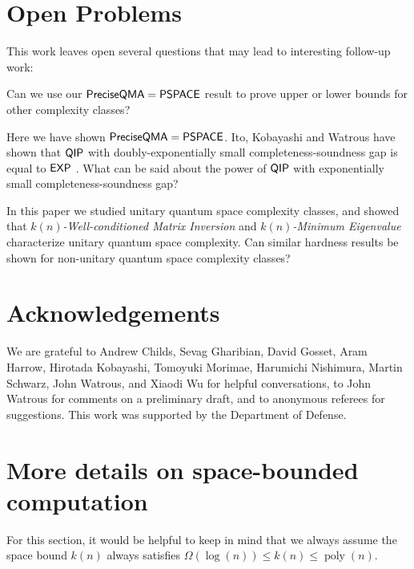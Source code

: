 \documentclass[11pt]{article}
\newtheorem{corollary}[theorem]{Corollary}
\theoremstyle{definition}
\theoremstyle{remark}
\newcommand\EXP{{\sf{EXP}}}
\newcommand\QIP{{\sf{QIP}}}
\newcommand\PSPACE{{\sf{PSPACE}}}
\newcommand\preciseQMA{{\sf{PreciseQMA}}}
\newcommand\matrixinvert[1]{{\ensuremath{#1}}\textit{-Well-conditioned Matrix Inversion}}
\newcommand\spechamiltonian[1]{\ensuremath{#1}\textit{-Minimum Eigenvalue}}
\newcommand{\classfont}{\sf}
\newcommand{\Unitary}{\mathbf{U}}
\newcommand{\unitaryQSPACE}[3]{{\classfont{Q}_\Unitary\classfont{SPACE}}[#1](#2,#3)}
\DeclareMathOperator{\poly}{poly}
\begin{document}
%


\section{Open Problems}
This work leaves open several questions that may lead to interesting follow-up work:
\begin{compactenum}
\begin{item} Can we use our $\preciseQMA=\PSPACE$ result to prove upper or lower bounds for other complexity classes? \end{item}
\begin{item} Here we have shown $\preciseQMA=\PSPACE$.  Ito, Kobayashi and Watrous  have shown that $\QIP$ with doubly-exponentially small completeness-soundness gap is equal to $\EXP$ \cite{ikw12}.  What can be said about the power of $\QIP$ with exponentially small completeness-soundness gap?\end{item}
\begin{item}In this paper we studied unitary quantum space complexity classes, and showed that \matrixinvert{k(n)} and \spechamiltonian{k(n)} characterize unitary quantum space complexity.  Can similar hardness results be shown for non-unitary quantum space complexity classes?\end{item}
\end{compactenum}


\section{Acknowledgements}
We are grateful to Andrew Childs, Sevag Gharibian, David Gosset, Aram Harrow, Hirotada Kobayashi, Tomoyuki Morimae, Harumichi Nishimura, Martin Schwarz, John Watrous, and Xiaodi Wu for helpful conversations, to John Watrous for comments on a preliminary draft, and to anonymous referees for suggestions. This work was supported by the Department of Defense.

\appendix

\section{More details on space-bounded computation}\label{app: space bounded}
For this section, it would be helpful to keep in mind that we always assume the space bound $k(n)$ always satisfies $\Omega(\log(n)) \le k(n) \le \poly(n)$.
\end{document}

